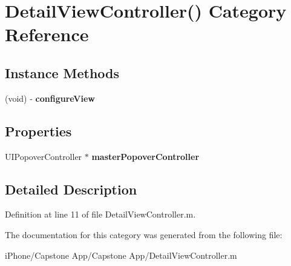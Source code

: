 \hypertarget{category_detail_view_controller_07_08}{\section{Detail\-View\-Controller() Category Reference}
\label{category_detail_view_controller_07_08}
}
\subsection*{Instance Methods}
\begin{DoxyCompactItemize}
\item 
\hypertarget{category_detail_view_controller_07_08_a6e444291096074b0a91839b7c0b2d78a}{(void) -\/ {\bfseries configure\-View}}\label{category_detail_view_controller_07_08_a6e444291096074b0a91839b7c0b2d78a}

\end{DoxyCompactItemize}
\subsection*{Properties}
\begin{DoxyCompactItemize}
\item 
\hypertarget{category_detail_view_controller_07_08_ab0e6b6e02ba51c08ab2590f269ef15f0}{U\-I\-Popover\-Controller $\ast$ {\bfseries master\-Popover\-Controller}}\label{category_detail_view_controller_07_08_ab0e6b6e02ba51c08ab2590f269ef15f0}

\end{DoxyCompactItemize}


\subsection{Detailed Description}


Definition at line 11 of file Detail\-View\-Controller.\-m.



The documentation for this category was generated from the following file\-:\begin{DoxyCompactItemize}
\item 
i\-Phone/\-Capstone App/\-Capstone App/Detail\-View\-Controller.\-m\end{DoxyCompactItemize}
